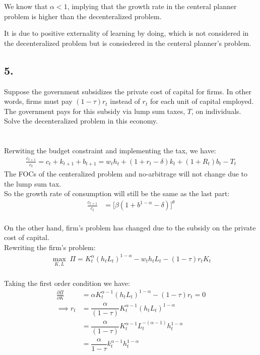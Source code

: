 \documentclass[12pt]{extarticle}
\def\secondarycolor{Golden}
\newcommand{\problem}[1]{
    \subsection*{\textcolor{\secondarycolor}{#1}}
    \addcontentsline{toc}{subsection}{\protect\numberline{}#1}
}
\newcommand{\rond}[2]{\frac{\partial #1}{\partial #2}}
\begin{document}
We know that $\alpha < 1$, implying that the growth rate in the centeral planner problem is higher than the decenteralized problem.


It is due to positive externality of learning by doing, which is not considered in the decenteralized problem but is consiedered in the centeral planner's problem.


\newpage
\problem{5.}Suppose the government subsidizes the private cost of capital for firms.
In other words, firms must pay $(1 - \tau)r_t$ instead of $r_t$ for each unit of capital employed.
The government pays for this subsidy via lump sum taxes, $T$, on individuals.
Solve the decenteralized problem in this economy.\\\\\\
Rerwiting the budget constraint and implementing the tax, we have:
\begin{align*}
    \frac{c_{t+1}}{c_t} = c_t + k_{t+1} + b_{t+1} = w_th_t + (1 + r_t - \delta) k_t + (1+R_t) b_t - T_t
\end{align*}
The FOCs of the centeralized problem and no-arbitrage will not change due to the lump sum tax.\\
So the growth rate of consumption will still be the same as the last part:
\begin{align}
    \frac{c_{t+1}}{c_t} &= \bigl[\beta(1 + b^{1-\alpha} - \delta)\bigr]^{\theta} 
\end{align}\\
On the other hand, firm's problem has changed due to the subsidy on the private cost of capital.\\
Rewriting the firm's problem:
\begin{align*}
    \max_{K, L} \; \Pi = K_t^{\alpha} (h_t L_t)^{1-\alpha} - w_th_tL_t - (1-\tau)r_tK_t
\end{align*}\\
Taking the first order condition we have:
\begin{align*}
    \rond{\Pi}{K}&= \alpha K_t^{\alpha-1} (h_tL_t)^{1-\alpha} - (1-\tau)r_t = 0\\
    \implies r_t &= \dfrac{\alpha}{(1-\tau)} K_t^{\alpha-1} (h_tL_t)^{1-\alpha}\\
    &= \dfrac{\alpha}{(1-\tau)} K_t^{\alpha-1} L_t^{-(\alpha-1)} h_t^{1-\alpha}\\
    &= \dfrac{\alpha}{1-\tau} k_t^{\alpha-1} h_t^{1-\alpha}
\end{align*}
\end{document}
